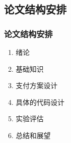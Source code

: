 \subsection{论文结构安排}
\begin{frame}
    \frametitle{论文结构安排}

    \begin{enumerate}
        \item 绪论
        \item 基础知识
        \item 支付方案设计
        \item 具体的代码设计
        \item 实验评估
        \item 总结和展望
    \end{enumerate}

\end{frame}

